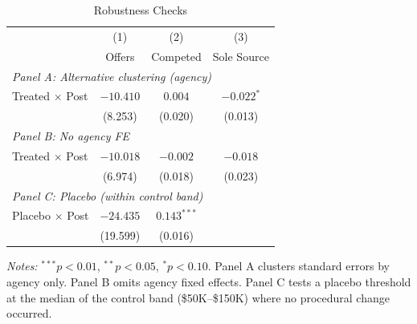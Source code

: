 \begin{table}[H]
\centering
\caption{Robustness Checks}
\label{tab:robust}
\begin{threeparttable}
\begin{tabular}{lccc}
\toprule
 & (1) & (2) & (3) \\
 & Offers & Competed & Sole Source \\
\midrule
\multicolumn{4}{l}{\textit{Panel A: Alternative clustering (agency)}} \\
Treated $\times$ Post & $-10.410$ & $0.004$ & $-0.022^{*}$ \\
 & (8.253) & (0.020) & (0.013) \\
\midrule
\multicolumn{4}{l}{\textit{Panel B: No agency FE}} \\
Treated $\times$ Post & $-10.018$ & $-0.002$ & $-0.018$ \\
 & (6.974) & (0.018) & (0.023) \\
\midrule
\multicolumn{4}{l}{\textit{Panel C: Placebo (within control band)}} \\
Placebo $\times$ Post & $-24.435$ & $0.143^{***}$ & \\
 & (19.599) & (0.016) & \\
\bottomrule
\end{tabular}
\begin{tablenotes}[flushleft]
\small
\item \textit{Notes:} $^{***}p<0.01$, $^{**}p<0.05$, $^{*}p<0.10$. Panel A clusters standard errors by agency only. Panel B omits agency fixed effects. Panel C tests a placebo threshold at the median of the control band (\$50K--\$150K) where no procedural change occurred.
\end{tablenotes}
\end{threeparttable}
\end{table}
